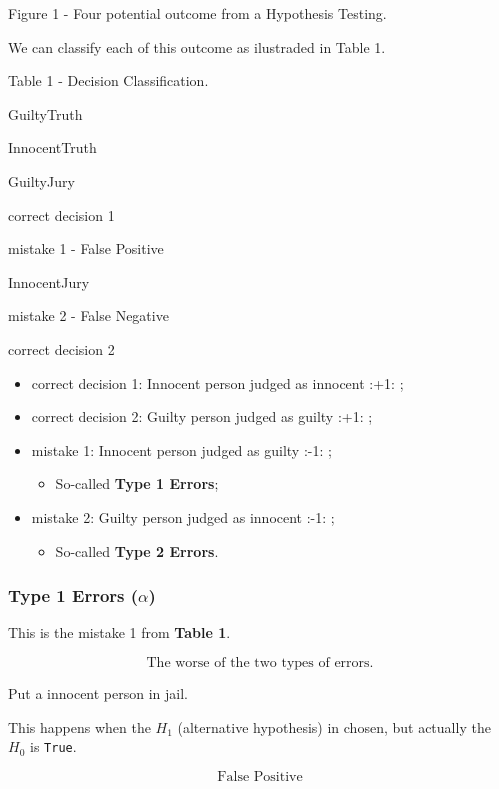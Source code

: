 \documentclass[]{book}
\providecommand{\tightlist}{%
  \setlength{\itemsep}{0pt}\setlength{\parskip}{0pt}}
\begin{document}
Figure 1 - Four potential outcome from a Hypothesis Testing.

We can classify each of this outcome as ilustraded in Table 1.

Table 1 - Decision Classification.

GuiltyTruth

InnocentTruth

GuiltyJury

correct decision 1

mistake 1 - False Positive

InnocentJury

mistake 2 - False Negative

correct decision 2

\begin{itemize}
\tightlist
\item
  correct decision 1: Innocent person judged as innocent :+1: ;
\item
  correct decision 2: Guilty person judged as guilty :+1: ;
\item
  mistake 1: Innocent person judged as guilty :-1: ;

  \begin{itemize}
  \tightlist
  \item
    So-called \textbf{Type 1 Errors};
  \end{itemize}
\item
  mistake 2: Guilty person judged as innocent :-1: ;

  \begin{itemize}
  \tightlist
  \item
    So-called \textbf{Type 2 Errors}.
  \end{itemize}
\end{itemize}

\subsubsection{\texorpdfstring{Type 1 Errors
(\(\alpha\))}{Type 1 Errors (\textbackslash{}alpha)}}\label{type-1-errors-alpha}

This is the mistake 1 from \textbf{Table 1}.

\[ \text{The worse of the two types of errors.} \]

Put a innocent person in jail.

This happens when the \(H_1\) (alternative hypothesis) in chosen, but
actually the \(H_0\) is \texttt{True}.

\[ \text{False Positive} \]
\end{document}
